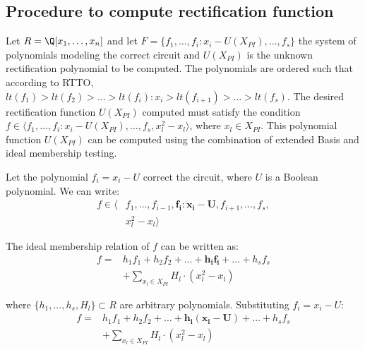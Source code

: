 
\subsection{Procedure to compute rectification function}

Let $R = \Q[x_1,\dots,x_n]$ and let $F = \{f_1,\dots,f_i:x_i-U(X_{PI}),\dots,f_s\}$ the system of polynomials modeling the correct circuit and $U(X_{PI})$ is the unknown rectification polynomial to be computed. The polynomials are ordered such that according to RTTO, $lt(f_1) > lt(f_2) > \dots > lt(f_i):x_i > lt(f_{i+1}) > \dots > lt(f_s)$. The desired rectification function $U(X_{PI})$ computed must satisfy the condition $f \in \langle f_1,\dots,f_i:x_i-U(X_{PI}),\dots,f_s,x_l^2-x_l \rangle$, where $x_l \in X_{PI}$. This polynomial function $U(X_{PI})$ can be computed using the combination of extended \Grobner Basis and ideal membership testing.

Let the polynomial $f_i = x_i-U$ correct the circuit, where $U$ is a Boolean polynomial. We can write:
\vspace{-1mm}
\begin{equation}
\label{eq:eqn1}
\begin{split}
   f \in \langle & f_1,\dots,f_{i-1},\boldsymbol{f_i: x_i - U},f_{i+1},\dots,f_s, \\
   & x_l^2-x_l \rangle 
\end{split}
\end{equation}

The ideal membership relation of $f$ can be written as:
\vspace{-0.5mm}
\begin{equation}
    \label{eq:eqn2}
\begin{split}
f = & h_1f_1 + h_2f_2 + \dots+\boldsymbol{h_if_i}+\dots+h_sf_s \\
& + \sum_{x_l \in X_{PI}} H_l
\cdot(x_l^2-x_l)    
\end{split}
\end{equation}

where $\{h_1,\dots,h_s,H_l\} \subset R$ are arbitrary polynomials. Substituting $f_i = x_i - U$:
\vspace{-1mm}
\begin{equation}
\begin{split}
    f = & h_1f_1 + h_2f_2 + \dots+\boldsymbol{h_i(x_i-U)}+\dots+h_sf_s \\
    & + \sum_{x_l \in X_{PI}} H_l \cdot(x_l^2-x_l)
\end{split}
\end{equation} 

